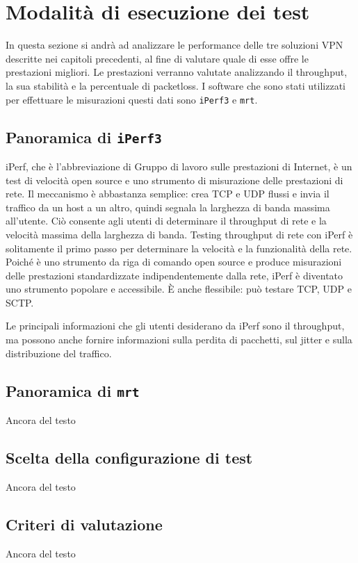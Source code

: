 \section{Modalità di esecuzione dei test}
In questa sezione si andrà ad analizzare le performance delle tre soluzioni VPN descritte nei capitoli precedenti, al fine di valutare quale di esse offre le prestazioni migliori.
Le prestazioni verranno valutate analizzando il throughput, la sua stabilità e la percentuale di packetloss.
I software che sono stati utilizzati per effettuare le misurazioni questi dati sono \texttt{iPerf3} e \texttt{mrt}.

\subsection{Panoramica di \texttt{iPerf3}}
iPerf, che è l'abbreviazione di Gruppo di lavoro sulle prestazioni di Internet, è un test di velocità open source e uno strumento di misurazione delle prestazioni di rete. Il meccanismo è abbastanza semplice: crea TCP e UDP flussi e invia il traffico da un host a un altro, quindi segnala la larghezza di banda massima all'utente. Ciò consente agli utenti di determinare il throughput di rete e la velocità massima della larghezza di banda.
Testing throughput di rete con iPerf è solitamente il primo passo per determinare la velocità e la funzionalità della rete. Poiché è uno strumento da riga di comando open source e produce misurazioni delle prestazioni standardizzate indipendentemente dalla rete, iPerf è diventato uno strumento popolare e accessibile. È anche flessibile: può testare TCP, UDP e SCTP.

Le principali informazioni che gli utenti desiderano da iPerf sono il throughput, ma possono anche fornire informazioni sulla perdita di pacchetti, sul jitter e sulla distribuzione del traffico.


\subsection{Panoramica di \texttt{mrt}}
Ancora del testo

\subsection{Scelta della configurazione di test}
Ancora del testo

\subsection{Criteri di valutazione}
Ancora del testo


